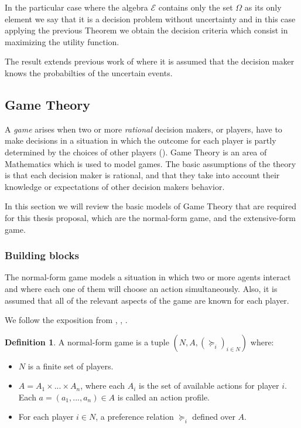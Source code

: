 \documentclass[english,letterpaper,12pt,final]{article}
\theoremstyle{definition}
\newtheorem{defi}{Definition}[section]
\begin{document}
	In the particular case where the algebra $\mathcal{E}$ contains only the set $\Omega$ as its only element we say that it is a decision problem without uncertainty and in this case applying the previous Theorem we obtain the decision criteria which consist in maximizing the utility function.
	
	The result extends previous work of \cite{von1944theory} where it is assumed that the decision maker knows the probabilties of the uncertain events.
	\subsection{Game Theory}
	A \textit{game} arises when two or more \textit{rational} decision makers, or players, have to make decisions in a situation in which the outcome for each player is partly determined by the choices of other players (\cite{binmore2008rational}). Game Theory is an area of Mathematics which is used to model games. The basic assumptions of the theory is that each decision maker is rational, and that they take into account their knowledge or expectations of other decision makers behavior.
	
	In this section we will review the basic models of Game Theory that are required for this thesis proposal, which are the normal-form game, and the extensive-form game. 
	\subsubsection{Building blocks}{\label{basic_models}}
	The normal-form game models a situation in which two or more agents interact and where each one of them will choose an action simultaneously. Also, it is assumed that all of the relevant aspects of the game are known for each player.
	
	We follow the exposition from \cite{osborne1994course}, \cite{binmore2007playing}, \cite{shoham2008multiagent}.
	
	\begin{defi}
	A normal-form game is a tuple $(N,A,(\succeq_i)_{i \in N})$ where:
	\begin{itemize}
	\item $N$ is a finite set of players.
	\item $A=A_1 \times ... \times A_n$, where each $A_i$ is the set of available actions for player $i$. Each $a=(a_1,...,a_n) \in A$ is called an action profile.
	\item For each player $i \in N$, a preference relation $\succeq_i$ defined over $A$.
	\end{itemize}
	\end{defi}
\end{document}
